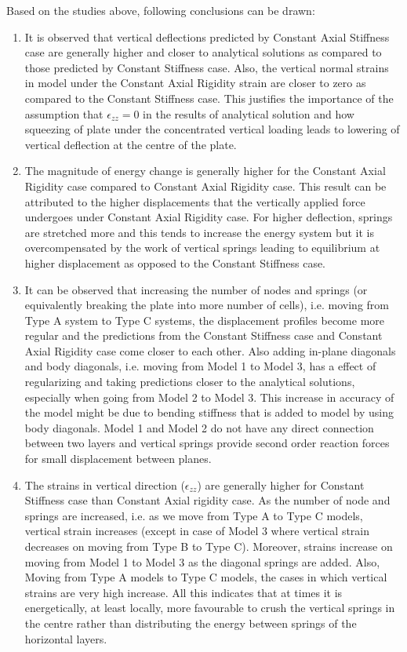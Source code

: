 Based on the studies above, following conclusions can be drawn:
\begin{enumerate}
    \item It is observed that vertical deflections predicted by Constant Axial Stiffness case are generally higher and closer to analytical solutions as compared to those predicted by Constant Stiffness case. Also, the vertical normal strains in model under the Constant Axial Rigidity strain are closer to zero as compared to the Constant Stiffness case. This justifies the importance of the assumption that $\epsilon_{zz} = 0$ in the results of analytical solution and how squeezing of plate under the concentrated vertical loading leads to lowering of vertical deflection at the centre of the plate.
    \item The magnitude of energy change is generally higher for the Constant Axial Rigidity case compared to Constant Axial Rigidity case. This result can be attributed to the higher displacements that the vertically applied force undergoes under Constant Axial Rigidity case. For higher deflection, springs are stretched more and this tends to increase the energy system but it is overcompensated by the work of vertical springs leading to equilibrium at higher displacement as opposed to the Constant Stiffness case.
    \item It can be observed that increasing the number of nodes and springs (or equivalently breaking the plate into more number of cells), i.e. moving from Type A system to Type C systems, the displacement profiles become more regular and the predictions from the Constant Stiffness case and Constant Axial Rigidity case come closer to each other. Also adding in-plane diagonals and body diagonals, i.e. moving from Model 1 to Model 3, has a effect of regularizing and taking predictions closer to the analytical solutions, especially when going from Model 2 to Model 3. This increase in accuracy of the model might be due to bending stiffness that is added to model by using body diagonals. Model 1 and Model 2 do not have any direct connection between two layers and vertical springs provide second order reaction forces for small displacement between planes.
    \item The strains in vertical direction ($\epsilon_{zz}$) are generally higher for Constant Stiffness case than Constant Axial rigidity case. As the number of node and springs are increased, i.e. as we move from Type A to Type C models, vertical strain increases (except in case of Model 3 where vertical strain decreases on moving from Type B to Type C). Moreover, strains increase on moving from Model 1 to Model 3 as the diagonal springs are added. Also, Moving from Type A models to Type C models, the cases in which vertical strains are very high increase. All this indicates that at times it is energetically, at least locally, more favourable to crush the vertical springs in the centre rather than distributing the energy between springs of the horizontal layers.

\end{enumerate}
